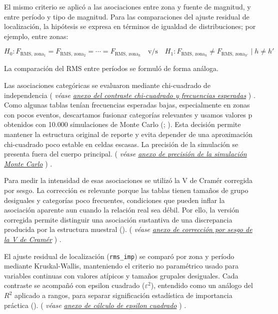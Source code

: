 \documentclass[
  spanish,
  letterpaper,
  DIV=11,
  numbers=noendperiod]{scrartcl}
\newcommand{\asesoriaParenRef}[1]{%
  \textnormal{\textcolor{asesoriaTextColor}{(}}%
  {\hypersetup{linkcolor=asesoriaLinkColor,urlcolor=asesoriaLinkColor,citecolor=asesoriaLinkColor}\textcolor{asesoriaTextColor}{\emph{#1}}}%
  \textnormal{\textcolor{asesoriaTextColor}{)}}%
}
\begin{document}
El mismo criterio se aplicó a las asociaciones entre zona y fuente de
magnitud, y entre período y tipo de magnitud. Para las comparaciones del
ajuste residual de localización, la hipótesis se expresa en términos de
igualdad de distribuciones; por ejemplo, entre zonas:

\begingroup
\setlength{\abovedisplayskip}{0pt}
\setlength{\belowdisplayskip}{0pt}
\setlength{\abovedisplayshortskip}{0pt}
\setlength{\belowdisplayshortskip}{0pt}
\vspace{-1.10em}
\[
H_0: F_{\text{RMS},\,\text{zona}_1}=F_{\text{RMS},\,\text{zona}_2}=\cdots=F_{\text{RMS},\,\text{zona}_k}
\quad \text{v/s} \quad
H_1: F_{\text{RMS},\,\text{zona}_h}\neq F_{\text{RMS},\,\text{zona}_{h'}} \mid h \neq h'
\]
\vspace{-1.15em}
\endgroup

La comparación del RMS entre períodos se formuló de forma análoga.

Las asociaciones categóricas se evaluaron mediante chi-cuadrado de
independencia
\asesoriaParenRef{véase \hyperref[sec-anexo-chi-esperadas]{anexo del contraste chi-cuadrado y frecuencias esperadas}}.
Como algunas tablas tenían frecuencias esperadas bajas, especialmente en
zonas con pocos eventos, descartamos fusionar categorías relevantes y
usamos valores p obtenidos con 10.000 simulaciones de Monte Carlo
(;
). Esta decisión permite
mantener la estructura original de reporte y evita depender de una
aproximación chi-cuadrado poco estable en celdas escasas. La precisión
de la simulación se presenta fuera del cuerpo principal.
\asesoriaParenRef{véase \hyperref[sec-anexo-montecarlo]{anexo de precisión de la simulación Monte Carlo}}.

Para medir la intensidad de esas asociaciones se utilizó la V de Cramér
corregida por sesgo. La corrección es relevante porque las tablas tienen
tamaños de grupo desiguales y categorías poco frecuentes, condiciones
que pueden inflar la asociación aparente aun cuando la relación real sea
débil. Por ello, la versión corregida permite distinguir una asociación
sustantiva de una discrepancia producida por la estructura muestral
().
\asesoriaParenRef{véase \hyperref[sec-anexo-cramer]{anexo de corrección por sesgo de la V de Cramér}}.

El ajuste residual de localización (\texttt{rms\_imp}) se comparó por
zona y período mediante Kruskal-Wallis, manteniendo el criterio no
paramétrico usado para variables continuas con valores atípicos y
tamaños grupales desiguales. Cada contraste se acompañó con epsilon
cuadrado (\(\varepsilon^2\)), entendido como un análogo del \(R^2\)
aplicado a rangos, para separar significación estadística de importancia
práctica ().
\asesoriaParenRef{véase \hyperref[sec-anexo-epsilon]{anexo de cálculo de epsilon cuadrado}}.
\end{document}
